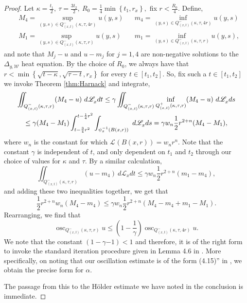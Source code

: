 \documentclass[a4paper, 12pt]{amsart}
\numberwithin{equation}{section}
\renewcommand{\~}{\tilde}
\renewcommand{\-}{\bar}
\newcommand{\8}{\infty}
\newcommand{\cW}{\mathcal{W}}
\DeclareMathOperator{\osc}{osc}
\newcommand{\cbrac}[1]{\left(#1\right)}
\newcommand{\dbrac}[1]{\left\{#1\right\}}
\newcommand{\set}[1]{\dbrac{#1}}
\newcommand{\script}[1]{\mathscr{#1}}
\newcommand{\Leb}[1][{}]{\script{L}^{#1}}			%
\begin{document}
\begin{proof}
Let 
$\kappa = \frac{t_1}{2},\ \tau = \frac{3t_2}{2},\ R_0 = \frac{1}{4} \min\set{t_1, r_x},$ fix $r < \frac{R_0}{4}$.
Define, 
\begin{align*}
&M_4 = \sup_{(y,s) \in Q^{-}_{(x,t)}(\kappa, \tau, 4r)} u(y,s) &&m_4 = \inf_{(y,s) \in Q^{-}_{(x,t)}(\kappa, \tau, 4r)} u(y,s) \\
&M_1 = \sup_{(y,s) \in Q^{-}_{(x,t)}(\kappa, \tau, r)} u(y,s) &&m_1 = \inf_{(y,s) \in Q^{-}_{(x,t)}(\kappa, \tau, r)} u(y,s), 
\end{align*} 
and note that $M_j - u$ and $u - m_j$ for $j = 1, 4$ are non-negative
solutions to the $\Delta_{g,\cW}$ heat equation.
By the choice of $R_0$,
we always have that $r < \min\set{ \sqrt{t - \kappa}, \sqrt{\tau - t}, r_x}$
for every $t \in [t_1, t_2]$. 
So, fix such a $t \in [t_1, t_2]$ we invoke Theorem \ref{thm:Harnack} and integrate,
\begin{multline*}
\iint_{Q^-_{(x,t)}(\kappa,\tau,r)} (M_4 - u)\ d\Leb_x dt 
	\leq \gamma \iint_{Q^-_{(x,t)}(\kappa,\tau,r)} \inf_{Q^+_{(x,t)}(\kappa, \tau, r)} (M_4 - u)\ d\Leb_x ds \\
	\leq \gamma (M_4 - M_1) \int_{t- \frac{3}{4}r^2}^{t - \frac{1}{4}r^2} \int_{\psi_x^{-1}(B(x,r))}\ d\Leb_x ds
	= \gamma w_n  \frac{1}{2}r^{2+n} (M_4 - M_1),$$
\end{multline*}
where $w_n$ is the constant for which $\Leb(B(x,r)) = w_n r^n$.
Note that the constant $\gamma$ is independent of $t$, and only 
dependent on $t_1$ and $t_2$ through our choice
of values for $\kappa$ and $\tau$. 
By a similar calculation, 
$$
\iint_{Q^-_{(x,t)}(\kappa,\tau,r)} (u - m_4)\ d\Leb_x dt \leq \gamma w_n \frac{1}{2}r^{2+n} (m_1 - m_4),$$
and adding these two inequalities together, 
we get that
$$
\frac{1}{2}r^{2+n} w_n (M_4 - m_4) \leq \gamma w_n \frac{1}{2}r^{2+n} (M_4 - m_4 +m_1 - M_1).$$
Rearranging, we find that 
$$
\osc_{Q^{-}_{(x,t)}(\kappa, \tau, r)} u \leq \cbrac{1 - \frac{1}{\gamma}} \osc_{Q^{-}_{(x,t)}(\kappa, \tau, 4r)} u.$$
We note that the constant $(1 - \gamma{-1}) < 1$
and therefore, it is of the right form to invoke the
standard iteration procedure given in Lemma 4.6 in \cite{Lieberman}. 
More specifically, on noting that
our oscillation estimate is of the form (4.15)'' in \cite{Lieberman},
we obtain the precise form for $\alpha$.

The passage from this to the Hölder estimate
we have noted in the conclusion is immediate. 
\end{proof}
\end{document}
